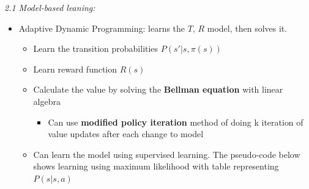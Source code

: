 \documentclass[12pt]{article}
\begin{document}
\noindent
\textsl{2.1 Model-based leaning:}
\begin{itemize}
 \item Adaptive Dynamic Programming: learns the $T$, $R$ model, then solves it. 
 \begin{itemize}
 \item Learn the transition probabilities $P(s' | s, \pi(s))$
 \item Learn reward function $R(s)$
 \item Calculate the value by solving the \textbf{Bellman equation} with linear algebra
 \begin{itemize}
  \item Can use \textbf{modified policy iteration} method of doing k iteration of value updates after each change to model
 \end{itemize}
  \item Can learn the model using supervised learning. The pseudo-code below shows learning using maximum likelihood with table representing $P(s | s, a)$
 \end{itemize}
 

\end{itemize}
\end{document}
